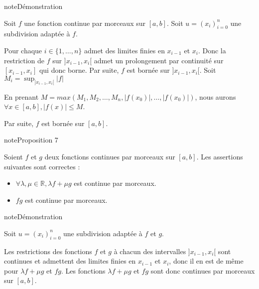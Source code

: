 \documentclass[letterpaper,10pt,french]{jupyterBook}
\begin{document}
\begin{sphinxadmonition}{note}{Démonstration}

\sphinxAtStartPar
Soit \(f\) une fonction continue par morceaux sur  \([a, b]\). Soit \(u=(x_i)_{i=0}^n\) une subdivision adaptée à \(f\).

\sphinxAtStartPar
Pour chaque \(i \in \{1, \ldots, n\}\) admet des limites finies en \(x_{i-1}\) et \(x_i\). Donc la restriction de \(f\) sur \(]x_{i-1}, x_i[\) admet un prolongement par continuité sur \([x_{i-1}, x_i]\) qui donc borne. Par suite, \(f\) est bornée sur \(]x_{i-1}, x_i[\). Soit \(M_i = \sup_{]x_{i-1}, x_i[}|f|\)

\sphinxAtStartPar
En prenant \(M = max (M_1, M_2, \ldots, M_n, |f(x_0)|, \ldots, |f(x_0)|)\), nous aurons \(\forall x \in [a, b], |f(x)| \leq M\).

\sphinxAtStartPar
Par suite, \(f\) est bornée sur \([a, b]\).
\end{sphinxadmonition}

\begin{sphinxadmonition}{note}{Proposition 7}

\sphinxAtStartPar
Soient \(f\) et \(g\) deux fonctions continues par morceaux sur \([a,b]\). Les assertions suivantes sont correctes :
\begin{itemize}
\item {} 
\sphinxAtStartPar
\( \forall \lambda, \mu \in \mathbb R, \lambda f + \mu g\) est continue par morceaux.

\item {} 
\sphinxAtStartPar
\(fg\) est continue par morceaux.

\end{itemize}
\end{sphinxadmonition}

\begin{sphinxadmonition}{note}{Démonstration}

\sphinxAtStartPar
Soit \(u=(x_i)_{i=0}^n\) une subdivision adaptée à \(f\) et \(g\).

\sphinxAtStartPar
Les restrictions des fonctions \(f\) et \(g\) à chacun des intervalles \( ]x_{i-1}, x_i[\) sont continues et admettent des limites finies en  \(x_{i-1}\) et \(x_i\), donc il en est de même pour \(\lambda f + \mu g\) et \(fg\). Les fonctions
\(\lambda f + \mu g\) et \(fg\) sont donc continues par morceaux sur \([a, b]\).
\end{sphinxadmonition}
\end{document}
